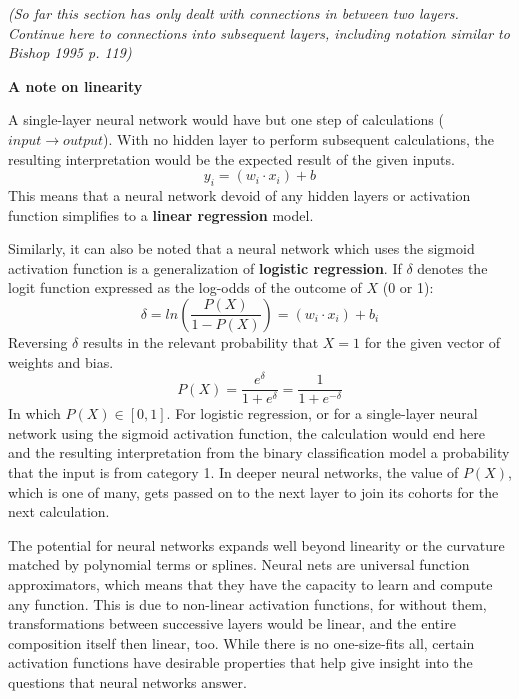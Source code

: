 \textit{(So far this section has only dealt with connections in between two layers.  Continue here to connections into subsequent layers, including notation similar to Bishop 1995 p. 119)}

\textbf{A note on linearity}

A single-layer neural network would have but one step of calculations ($input \rightarrow output$).  With no hidden layer to perform subsequent calculations, the resulting interpretation would be the expected result of the given inputs.
$$
y_i = (w_i \cdot x_i) + b
$$
This means that a neural network devoid of any hidden layers or activation function simplifies to a \textbf{linear regression} model. \cite{sharma2017activation}




Similarly, it can also be noted that a neural network which uses the sigmoid activation function is a generalization of \textbf{logistic regression}. \cite{dreiseitl2002logistic} \cite{schumacher1996neural}  If $\delta$ denotes the logit function expressed as the log-odds of the outcome of $X$ (0 or 1):
$$
\delta = ln \left( \frac{P(X)}{1-P(X)} \right) = (w_i \cdot x_i) + b_i 
$$
Reversing $\delta$ results in the relevant probability that $X = 1$ for the given vector of weights and bias.
$$
P(X) = \frac{e^\delta}{1+e^\delta} = \frac{1}{1+e^{-\delta}}
$$
In which $P(X) \in [0,1]$.  For logistic regression, or for a single-layer neural network using the sigmoid activation function, the calculation would end here and the resulting interpretation from the binary classification model a probability that the input is from category 1.  In deeper neural networks, the value of $P(X)$, which is one of many, gets passed on to the next layer to join its cohorts for the next calculation.

The potential for neural networks expands well beyond linearity or the curvature matched by polynomial terms or splines.  Neural nets are universal function approximators, which means that they have the capacity to learn and compute any function. \cite{sharma2017activation} This is due to non-linear activation functions, for without them, transformations between successive layers would be linear, and the entire composition itself then linear, too. \cite{bishop1995}  While there is no one-size-fits all, certain activation functions have desirable properties that help give insight into the questions that neural networks answer.


